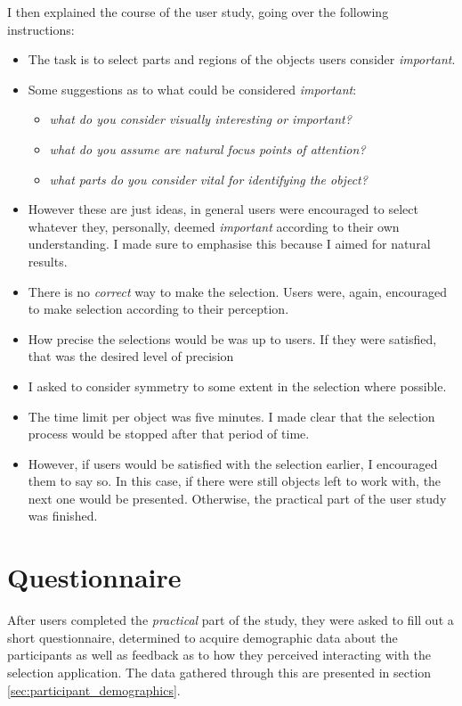 I then explained the course of the user study, going over the following instructions:
\begin{itemize}
	\item The task is to select parts and regions of the objects users consider \textit{important}.
	\item Some suggestions as to what could be considered \textit{important}:
		\begin{itemize}
			\item \textit{what do you consider visually interesting or important?}
			\item \textit{what do you assume are natural focus points of attention?}
			\item \textit{what parts do you consider vital for identifying the object?}
		\end{itemize}
	\item However these are just ideas, in general users were encouraged to select whatever they, personally, deemed \textit{important} according to their own understanding. I made sure to emphasise this because I aimed for natural results.
	\item There is no \textit{correct} way to make the selection. Users were, again, encouraged to make selection according to their perception.
	\item How precise the selections would be was up to users. If they were satisfied, that was the desired level of precision
	\item I asked to consider symmetry to some extent in the selection where possible.
	\item The time limit per object was five minutes. I made clear that the selection process would be stopped after that period of time.
	\item However, if users would be satisfied with the selection earlier, I encouraged them to say so. In this case, if there were still objects left to work with, the next one would be presented. Otherwise, the practical part of the user study was finished.
\end{itemize}

	\section{Questionnaire}
	\label{sec:questionnaire}
After users completed the \textit{practical} part of the study, they were asked to fill out a short questionnaire, determined to acquire demographic data about the participants as well as feedback as to how they perceived interacting with the selection application. The data gathered through this are presented in section \ref{sec:participant_demographics}. 

